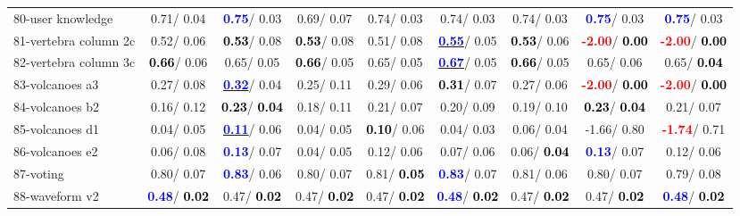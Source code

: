 \begin{table}[h]
\begin{center}
\begin{tabular}{lc|c|c|c|c|c|c|c}
80-user knowledge &   0.71/  0.04 & \textcolor{blue}{\textbf{  0.75}}/  0.03 &   0.69/  0.07 &   0.74/  0.03 &   0.74/  0.03 &   0.74/  0.03 & \textcolor{blue}{\textbf{  0.75}}/  0.03 & \textcolor{blue}{\textbf{  0.75}}/  0.03 \\
81-vertebra column 2c &   0.52/  0.06 & \textcolor{black}{\textbf{  0.53}}/  0.08 & \textcolor{black}{\textbf{  0.53}}/  0.08 &   0.51/  0.08 & \underline{\textcolor{blue}{\textbf{  0.55}}}/  0.05 & \textcolor{black}{\textbf{  0.53}}/  0.06 & \textcolor{red}{\textbf{ -2.00}}/\textcolor{black}{\textbf{  0.00}} & \textcolor{red}{\textbf{ -2.00}}/\textcolor{black}{\textbf{  0.00}} \\
82-vertebra column 3c & \textcolor{black}{\textbf{  0.66}}/  0.06 &   0.65/  0.05 & \textcolor{black}{\textbf{  0.66}}/  0.05 &   0.65/  0.05 & \underline{\textcolor{blue}{\textbf{  0.67}}}/  0.05 & \textcolor{black}{\textbf{  0.66}}/  0.05 &   0.65/  0.06 &   0.65/\textcolor{black}{\textbf{  0.04}} \\
83-volcanoes a3 &   0.27/  0.08 & \underline{\textcolor{blue}{\textbf{  0.32}}}/  0.04 &   0.25/  0.11 &   0.29/  0.06 & \textcolor{black}{\textbf{  0.31}}/  0.07 &   0.27/  0.06 & \textcolor{red}{\textbf{ -2.00}}/\textcolor{black}{\textbf{  0.00}} & \textcolor{red}{\textbf{ -2.00}}/\textcolor{black}{\textbf{  0.00}} \\
84-volcanoes b2 &   0.16/  0.12 & \textcolor{black}{\textbf{  0.23}}/\textcolor{black}{\textbf{  0.04}} &   0.18/  0.11 &   0.21/  0.07 &   0.20/  0.09 &   0.19/  0.10 & \textcolor{black}{\textbf{  0.23}}/\textcolor{black}{\textbf{  0.04}} &   0.21/  0.07 \\
85-volcanoes d1 &   0.04/  0.05 & \underline{\textcolor{blue}{\textbf{  0.11}}}/  0.06 &   0.04/  0.05 & \textcolor{black}{\textbf{  0.10}}/  0.06 &   0.04/  0.03 &   0.06/  0.04 &  -1.66/  0.80 & \textcolor{red}{\textbf{ -1.74}}/  0.71 \\ \hline
86-volcanoes e2 &   0.06/  0.08 & \textcolor{blue}{\textbf{  0.13}}/  0.07 &   0.04/  0.05 &   0.12/  0.06 &   0.07/  0.06 &   0.06/\textcolor{black}{\textbf{  0.04}} & \textcolor{blue}{\textbf{  0.13}}/  0.07 &   0.12/  0.06 \\
87-voting &   0.80/  0.07 & \textcolor{blue}{\textbf{  0.83}}/  0.06 &   0.80/  0.07 &   0.81/\textcolor{black}{\textbf{  0.05}} & \textcolor{blue}{\textbf{  0.83}}/  0.07 &   0.81/  0.06 &   0.80/  0.07 &   0.79/  0.08 \\
88-waveform v2 & \textcolor{blue}{\textbf{  0.48}}/\textcolor{black}{\textbf{  0.02}} &   0.47/\textcolor{black}{\textbf{  0.02}} &   0.47/\textcolor{black}{\textbf{  0.02}} &   0.47/\textcolor{black}{\textbf{  0.02}} & \textcolor{blue}{\textbf{  0.48}}/\textcolor{black}{\textbf{  0.02}} &   0.47/\textcolor{black}{\textbf{  0.02}} &   0.47/\textcolor{black}{\textbf{  0.02}} & \textcolor{blue}{\textbf{  0.48}}/\textcolor{black}{\textbf{  0.02}} \\

\end{tabular}
\end{center}
\end{table}
